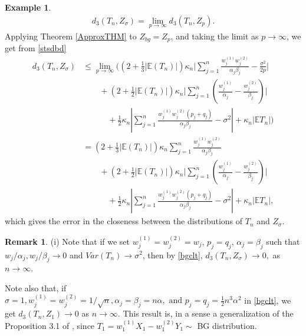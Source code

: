 \documentclass[12pt, a4paper,reqno]{amsart}
\theoremstyle{definition}
\newtheorem{exmp}[thm]{Example}
\theoremstyle{myremark}
\newtheorem{rem}[thm]{Remark}
\numberwithin{equation}{section}
\begin{document}
\begin{exmp}
\begin{align}\label{svgcf1100}
d_{3}(T_n,Z_\sigma)= \lim_{p \to \infty}d_{3}(T_n,Z_p).
\end{align}
\noindent
Applying Theorem \ref{ApproxTHM} to $Z_{bg} = Z_p$, and taking the limit as $p\to \infty$, we get from \eqref{stsdbd}
	\begin{align}\label{bgclt}
\nonumber	d_{3}(T_n,Z_\sigma) & \leq \lim_{p\to\infty}\bigg(  \left(2+\frac{1}{3}|\mathbb{E}(T_n)|\right)\kappa_n \bigg|\sum_{j=1}^{n}\frac{w_{j}^{(1)}w_{j}^{(2)} }{\alpha_j \beta_j}- \frac{\sigma^2}{2p}\bigg|\\
\nonumber &\quad\quad+\left(2+\frac{1}{2}|\mathbb{E}(T_n)|\right)\kappa_n\bigg| \sum_{j=1}^{n}\left(\frac{w_{j}^{(1)} }{\alpha_j}-\frac{w_{j}^{(2)}}{\beta_j} \right)\bigg|\\
\nonumber &\quad\quad\quad+\frac{1}{2}\kappa_n\left| \sum_{j=1}^{n}\frac{w_{j}^{(1)}w_{j}^{(2)}(p_j+q_j)}{\alpha_j \beta_j} -\sigma^2 \right|+\kappa_n\left|\mathbb{E}T_n\right|\bigg)\\
\nonumber &= \left(2+\frac{1}{3}|\mathbb{E}(T_n)|\right)\kappa_n \sum_{j=1}^{n}\frac{w_{j}^{(1)}w_{j}^{(2)} }{\alpha_j \beta_j}\\
\nonumber &\quad\quad+\left(2+\frac{1}{2}|\mathbb{E}(T_n)|\right)\kappa_n\bigg| \sum_{j=1}^{n}\left(\frac{w_{j}^{(1)} }{\alpha_j}-\frac{w_{j}^{(2)}}{\beta_j} \right)\bigg|\\
&\quad\quad\quad+\frac{1}{2}\kappa_n\left| \sum_{j=1}^{n}\frac{w_{j}^{(1)}w_{j}^{(2)}(p_j+q_j)}{\alpha_j \beta_j} -\sigma^2 \right|+\kappa_n\left|\mathbb{E}T_n\right|,
\end{align}
which gives the error in the closeness between the distributions of $T_n$ and $Z_\sigma$. 
\end{exmp}
\begin{rem}
(i) Note that if we set $w_j^{(1)}=w_j^{(2)}=w_j$, $p_j=q_j$, $\alpha_j=\beta_j$ such that $w_j/\alpha_j,w_j/\beta_j \to 0$ and $Var(T_n) \to \sigma
^2$, then by \eqref{bgclt}, $d_3(T_n, Z_\sigma) \to 0,$ as $n \to \infty$.

\item [(ii)]Note also that, if $\sigma=1, w_j^{(1)}=w_j^{(2)}=1/\sqrt{n}, \alpha_j=\beta_j=n\alpha , \text{ and } p_j=q_j=\frac{1}{2}n^3\alpha^2$ in \eqref{bgclt}, we get $d_3(T_n,Z_1) \to 0$ as $n\to \infty$. This result is, in a sense a generalization of the Proposition 3.1 of \cite{bilateral0}, since $T_1=w_1^{(1)}X_1-w_1^{(2)}Y_1\sim $ BG distribution.
\end{rem}
\end{document}
